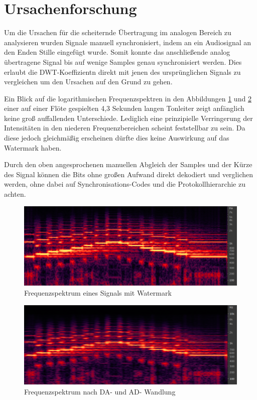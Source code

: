 \section{Ursachenforschung}

Um die Ursachen für die scheiternde Übertragung im analogen Bereich zu analysieren wurden Signale manuell synchronisiert, indem an ein Audiosignal an den Enden Stille eingefügt wurde. Somit konnte das anschließende analog übertragene Signal bis auf wenige Samples genau synchronisiert werden. Dies erlaubt die DWT-Koeffizientn direkt mit jenen des ursprünglichen Signals zu vergleichen um den Ursachen auf den Grund zu gehen. 

Ein Blick auf die logarithmischen Frequenzspektren in den Abbildungen \ref{fig:spektrum-original} und \ref{fig:spektrum-soundkarte} einer auf einer Flöte gespielten 4,3 Sekunden langen Tonleiter zeigt anfänglich keine groß auffallenden Unterschiede. Lediglich eine prinzipielle Verringerung der Intensitäten in den niederen Frequenzbereichen scheint feststellbar zu sein. Da diese jedoch gleichmäßig erscheinen dürfte dies keine Auswirkung auf das Watermark haben. 

Durch den oben angesprochenen manuellen Abgleich der Samples und der Kürze des Signal können die Bits ohne großen Aufwand direkt dekodiert und verglichen werden, ohne dabei auf Synchronisations-Codes und die Protokollhierarchie zu achten.

\newpage

\begin{figure}[h]
	\centering
	\includegraphics[width=\textwidth]{figures/spektrum-original.png}
	\caption{Frequenzspektrum eines Signals mit Watermark}
	\label{fig:spektrum-original}
\end{figure}

\begin{figure}[h]
	\centering
	\includegraphics[width=\textwidth]{figures/spektrum-soundkarte.png}
	\caption{Frequenzspektrum nach DA- und AD- Wandlung}
	\label{fig:spektrum-soundkarte}
\end{figure}

